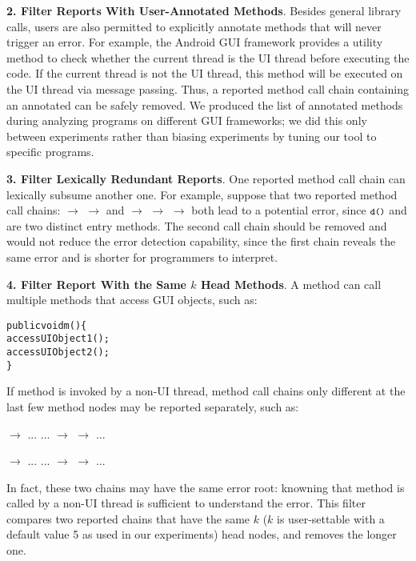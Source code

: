 \textbf{2. Filter Reports With User-Annotated Methods}. Besides general
library calls, users are also permitted to explicitly annotate methods
that will never trigger an error.
For example, the Android GUI framework provides a utility method 
 to check whether the current thread is the UI thread
before executing the code. If the current thread is not the UI thread,
this method will be executed on the UI thread via message passing.
Thus, a reported method call chain containing an annotated 
can be safely removed. We produced the list of annotated methods
during analyzing programs on different GUI frameworks; we did this
only between experiments rather than biasing experiments by tuning
our tool to specific programs.

\textbf{3. Filter Lexically Redundant Reports}. One reported method call
chain can lexically subsume another one. For example, suppose that two
reported method call chains:  $\rightarrow$ 
$\rightarrow$  and 
 $\rightarrow$  $\rightarrow$  $\rightarrow$ 
both lead to a potential error, since $\CodeIn{d()}$ and 
are two distinct entry methods. The second call chain should
be removed and would not reduce the error detection capability, since
the first chain reveals the same error and is shorter 
for programmers to interpret.


\textbf{4. Filter Report With the Same $k$ Head Methods}. A method can call
multiple methods that access GUI objects, such as:
\begin{CodeOut}
\begin{alltt}
     public void m() \{
         accessUIObject1();
         accessUIObject2();
     \}
\end{alltt}
\end{CodeOut}
If method  is invoked by a non-UI thread, method call chains
only different at the last few method nodes may be reported separately, such as:

 $\rightarrow$ ... ... $\rightarrow$  $\rightarrow$  ...

 $\rightarrow$ ... ... $\rightarrow$  $\rightarrow$  ...

In fact, these two chains may have the same error root: knowning that
method  is called by a non-UI thread is sufficient to understand
the error.
This filter compares two reported chains that have the same
$k$ ($k$ is user-settable with a default value 5 as used in our
experiments) head nodes, and removes the longer one.


